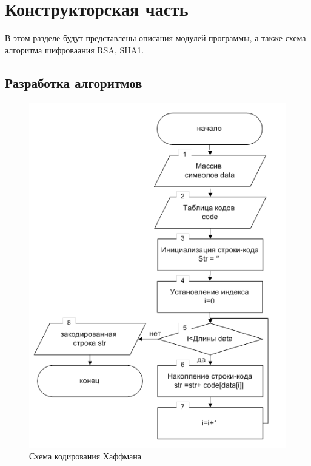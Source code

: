 \chapter{Конструкторская часть}

В этом разделе будут представлены описания модулей программы, а также схема алгоритма шифроваания RSA, SHA1.

\section{Разработка алгоритмов}

\begin{figure}[ht!]
	\centering
	\includegraphics[width=0.6\linewidth]{img/rsa.png}
	\caption{Схема кодирования Хаффмана}
	\label{img:rsa}
\end{figure}

